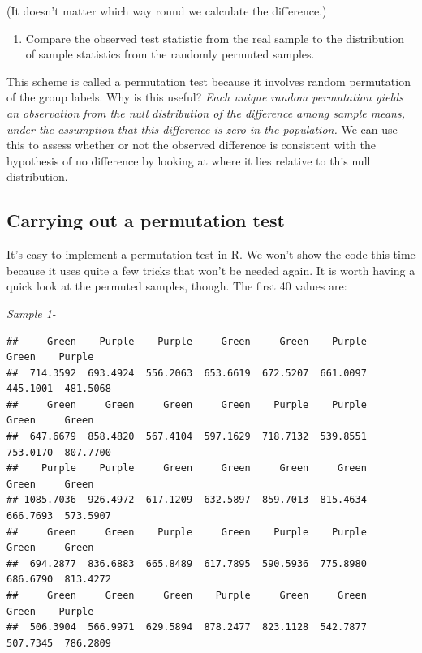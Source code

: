 \documentclass[
]{book}
\providecommand{\tightlist}{%
  \setlength{\itemsep}{0pt}\setlength{\parskip}{0pt}}
\begin{document}
(It doesn't matter which way round we calculate the difference.)

\begin{enumerate}
\def\labelenumi{\arabic{enumi}.}
\setcounter{enumi}{3}
\tightlist
\item
  Compare the observed test statistic from the real sample to the distribution of sample statistics from the randomly permuted samples.
\end{enumerate}

This scheme is called a permutation test because it involves random permutation of the group labels. Why is this useful? \emph{Each unique random permutation yields an observation from the null distribution of the difference among sample means, under the assumption that this difference is zero in the population.} We can use this to assess whether or not the observed difference is consistent with the hypothesis of no difference by looking at where it lies relative to this null distribution.

\hypertarget{carrying-out-a-permutation-test}{%
\subsection{Carrying out a permutation test}\label{carrying-out-a-permutation-test}}

It's easy to implement a permutation test in R. We won't show the code this time because it uses quite a few tricks that won't be needed again. It is worth having a quick look at the permuted samples, though. The first 40 values are:

\emph{Sample 1-}

\begin{verbatim}
##     Green    Purple    Purple     Green     Green    Purple     Green    Purple 
##  714.3592  693.4924  556.2063  653.6619  672.5207  661.0097  445.1001  481.5068 
##     Green     Green     Green     Green    Purple    Purple     Green     Green 
##  647.6679  858.4820  567.4104  597.1629  718.7132  539.8551  753.0170  807.7700 
##    Purple    Purple     Green     Green     Green     Green     Green     Green 
## 1085.7036  926.4972  617.1209  632.5897  859.7013  815.4634  666.7693  573.5907 
##     Green     Green    Purple     Green    Purple    Purple     Green     Green 
##  694.2877  836.6883  665.8489  617.7895  590.5936  775.8980  686.6790  813.4272 
##     Green     Green     Green    Purple     Green     Green     Green    Purple 
##  506.3904  566.9971  629.5894  878.2477  823.1128  542.7877  507.7345  786.2809
\end{verbatim}
\end{document}
